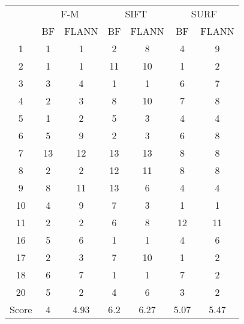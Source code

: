 \documentclass[draft,final]{vutinfth} %
\begin{document}
\begin{appendices}
\begin{minipage}{\linewidth}
\centering
\begin{tabular}{c|cc|cc|cc}
\multirow{2}{*}{ } & \multicolumn{2}{c}{ F-M } & \multicolumn{2}{c}{ SIFT } & \multicolumn{2}{c}{ SURF } \\
& BF & FLANN & BF & FLANN & BF & FLANN \\
\hline
1 & 1 & 1 & 2 & 8 & 4 & 9 \\
2 & 1 & 1 & 11 & 10 & 1 & 2 \\
3 & 3 & 4 & 1 & 1 & 6 & 7 \\
4 & 2 & 3 & 8 & 10 & 7 & 8 \\
5 & 1 & 2 & 5 & 3 & 4 & 4 \\
6 & 5 & 9 & 2 & 3 & 6 & 8 \\
7 & 13 & 12 & 13 & 13 & 8 & 8 \\
8 & 2 & 2 & 12 & 11 & 8 & 8 \\
9 & 8 & 11 & 13 & 6 & 4 & 4 \\
10 & 4 & 9 & 7 & 3 & 1 & 1 \\
11 & 2 & 2 & 6 & 8 & 12 & 11 \\
16 & 5 & 6 & 1 & 1 & 4 & 6 \\
17 & 2 & 3 & 7 & 10 & 1 & 2 \\
18 & 6 & 7 & 1 & 1 & 7 & 2 \\
20 & 5 & 2 & 4 & 6 & 3 & 2 \\
\hline
Score & 4 & 4.93 & 6.2 & 6.27 & 5.07 & 5.47 \\
\end{tabular}
 \label{tab:25Mean} 
\end{minipage}



\end{appendices}
\end{document}
